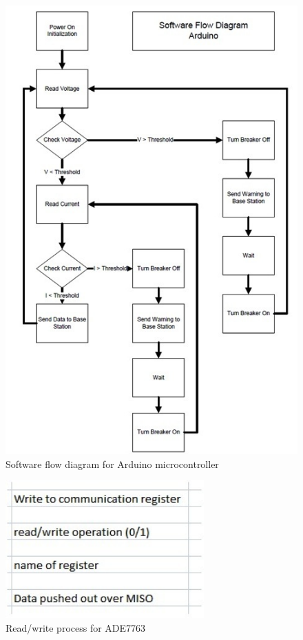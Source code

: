 \begin{figure}[htbp]
\begin{center}
\includegraphics[width=5in]{includes/NJArduinoSoftwareFlow}
\caption{Software flow diagram for Arduino microcontroller}
\label{fig:arduino_software_flow}
\end{center}
\end{figure}

\begin{figure}[htbp]
\begin{center}
\includegraphics[width=3in]{includes/NJADEread} 
\caption{Read/write process for ADE7763}
\label{fig:ade_read}   
\end{center}
\end{figure}

